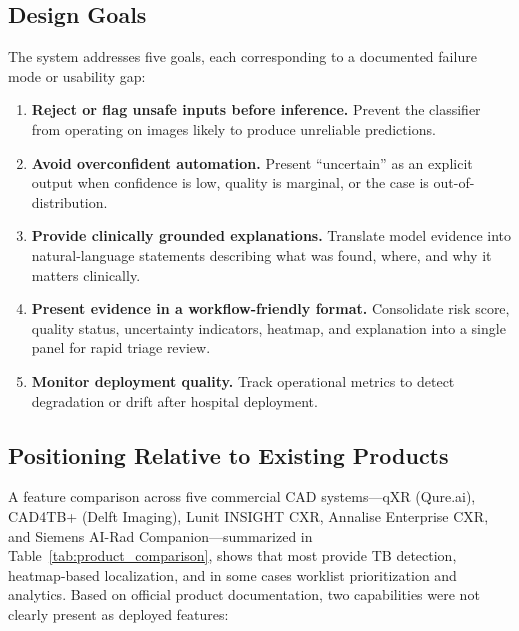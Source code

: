 \documentclass[conference, letterpaper]{IEEEtran}
\begin{document}
\subsection{Design Goals}

The system addresses five goals, each corresponding to a documented failure mode or usability gap:

\begin{enumerate}
    \item \textbf{Reject or flag unsafe inputs before inference.} Prevent the classifier from operating on images likely to produce unreliable predictions.
    \item \textbf{Avoid overconfident automation.} Present ``uncertain'' as an explicit output when confidence is low, quality is marginal, or the case is out-of-distribution.
    \item \textbf{Provide clinically grounded explanations.} Translate model evidence into natural-language statements describing what was found, where, and why it matters clinically.
    \item \textbf{Present evidence in a workflow-friendly format.} Consolidate risk score, quality status, uncertainty indicators, heatmap, and explanation into a single panel for rapid triage review.
    \item \textbf{Monitor deployment quality.} Track operational metrics to detect degradation or drift after hospital deployment.
\end{enumerate}

\subsection{Positioning Relative to Existing Products}

A feature comparison across five commercial CAD systems---qXR (Qure.ai), CAD4TB+ (Delft Imaging), Lunit INSIGHT CXR, Annalise Enterprise CXR, and Siemens AI-Rad Companion---summarized in Table~\ref{tab:product_comparison}, shows that most provide TB detection, heatmap-based localization, and in some cases worklist prioritization and analytics. Based on official product documentation, two capabilities were not clearly present as deployed features:
\end{document}
